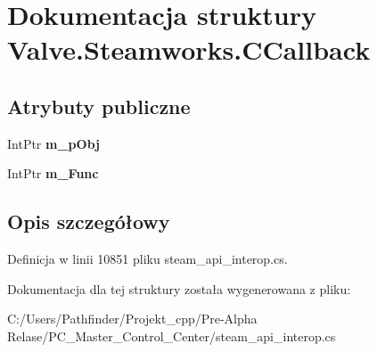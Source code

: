 \hypertarget{struct_valve_1_1_steamworks_1_1_c_callback}{}\section{Dokumentacja struktury Valve.\+Steamworks.\+C\+Callback}
\label{struct_valve_1_1_steamworks_1_1_c_callback}
\subsection*{Atrybuty publiczne}
\begin{DoxyCompactItemize}
\item 
\mbox{\label{struct_valve_1_1_steamworks_1_1_c_callback_af42bf956248b920e4d922fd31bd16691}} 
Int\+Ptr {\bfseries m\+\_\+p\+Obj}
\item 
\mbox{\label{struct_valve_1_1_steamworks_1_1_c_callback_ab2440c05b7900684c0d5a488769445a4}} 
Int\+Ptr {\bfseries m\+\_\+\+Func}
\end{DoxyCompactItemize}


\subsection{Opis szczegółowy}


Definicja w linii 10851 pliku steam\+\_\+api\+\_\+interop.\+cs.



Dokumentacja dla tej struktury została wygenerowana z pliku\+:\begin{DoxyCompactItemize}
\item 
C\+:/\+Users/\+Pathfinder/\+Projekt\+\_\+cpp/\+Pre-\/\+Alpha Relase/\+P\+C\+\_\+\+Master\+\_\+\+Control\+\_\+\+Center/steam\+\_\+api\+\_\+interop.\+cs\end{DoxyCompactItemize}
